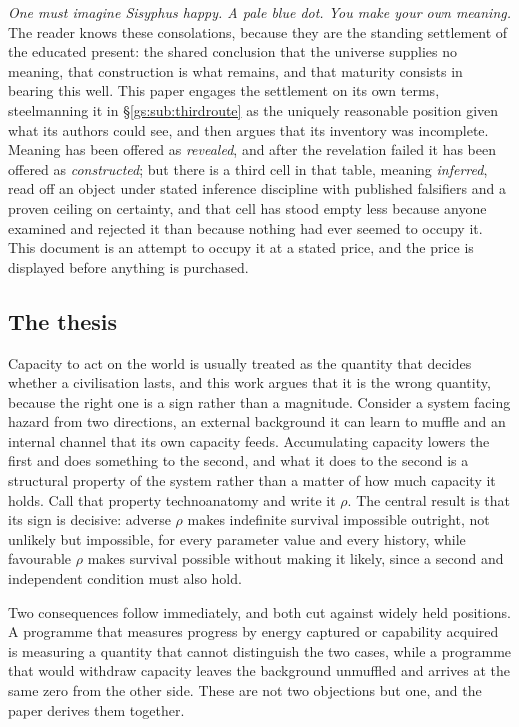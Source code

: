\documentclass[11pt]{article}
\numberwithin{equation}{section}
\theoremstyle{plain}
\theoremstyle{definition}
\theoremstyle{remark}
\begin{document}
\emph{One must imagine Sisyphus happy. A pale blue dot. You make
your own meaning.} The reader knows these consolations, because they
are the standing settlement of the educated present: the shared
conclusion that the universe supplies no meaning, that construction
is what remains, and that maturity consists in bearing this well.
This paper engages the settlement on its own terms, steelmanning it
in \S\ref{gs:sub:thirdroute} as the uniquely reasonable position
given what its authors could see, and then argues that its inventory
was incomplete. Meaning has been offered as \emph{revealed}, and
after the revelation failed it has been offered as
\emph{constructed}; but there is a third cell in that table, meaning
\emph{inferred}, read off an object under stated inference
discipline with published falsifiers and a proven ceiling on
certainty, and that cell has stood empty less because anyone
examined and rejected it than because nothing had ever seemed to
occupy it. This document is an attempt to occupy it at a stated
price, and the price is displayed before anything is purchased.

\subsection{The thesis}\label{intro:sub:thesis}

Capacity to act on the world is usually treated as the quantity that
decides whether a civilisation lasts, and this work argues that it is
the wrong quantity, because the right one is a sign rather than a
magnitude. Consider a system facing hazard from two directions, an
external background it can learn to muffle and an internal channel
that its own capacity feeds. Accumulating capacity lowers the first
and does something to the second, and what it does to the second is a
structural property of the system rather than a matter of how much
capacity it holds. Call that property technoanatomy and write it
$\rho$. The central result is that its sign is decisive: adverse
$\rho$ makes indefinite survival impossible outright, not unlikely
but impossible, for every parameter value and every history, while
favourable $\rho$ makes survival possible without making it likely,
since a second and independent condition must also hold.

Two consequences follow immediately, and both cut against widely held
positions. A programme that measures progress by energy captured or
capability acquired is measuring a quantity that cannot distinguish
the two cases, while a programme that would withdraw capacity leaves
the background unmuffled and arrives at the same zero from the other
side. These are not two objections but one, and the paper derives
them together.
\end{document}
